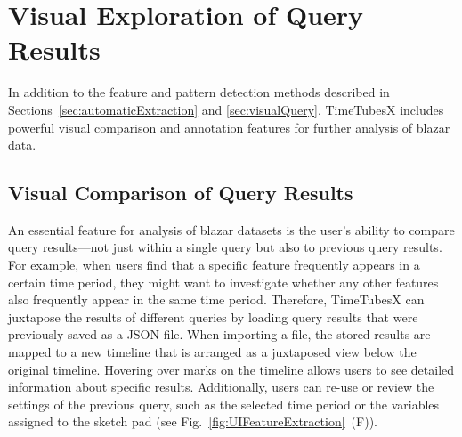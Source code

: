 \section{Visual Exploration of Query Results}\label{sec:otherFunctions}
In addition to the feature and pattern detection methods described in Sections~\ref{sec:automaticExtraction} and \ref{sec:visualQuery}, TimeTubesX includes powerful visual comparison and annotation features for further analysis of blazar data.


\subsection{Visual Comparison of Query Results}
An essential feature for analysis of blazar datasets is the user's ability to compare query results---not just within a single query but also to previous query results. 
For example, when users find that a specific feature frequently appears in a certain time period,
they might want to investigate whether any other features also frequently appear in the same time period.
Therefore, TimeTubesX can juxtapose the results of different queries
by loading query results that were previously saved as a JSON file.
%
When importing a file, the stored results are mapped to a new timeline that is arranged as a juxtaposed view below the original timeline.
Hovering over marks on the timeline allows users to see detailed information about specific results.
Additionally, users can re-use or review the settings of the previous query, such as the selected time period or the variables assigned to the sketch pad (see Fig.~\ref{fig:UIFeatureExtraction}~(F)).

